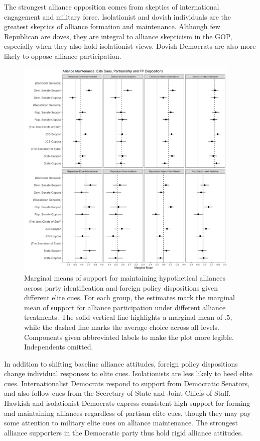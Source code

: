 \documentclass[12pt]{article}
\begin{document}
The strongest alliance opposition comes from skeptics of international engagement and military force. 
Isolationist and dovish individuals are the greatest skeptics of alliance formation and maintenance. 
Although few Republican are doves, they are integral to alliance skepticism in the GOP, especially when they also hold isolationist views.
Dovish Democrats are also more likely to oppose alliance participation.  


\begin{figure}
	\centering
		\includegraphics[width=0.95\textwidth]{../figures/party-dispo-main-el.png}
	\caption{Marginal means of support for maintaining hypothetical alliances across party identification and foreign policy dispositions given different elite cues. For each group, the estimates mark the marginal mean of support for alliance participation under different alliance treatments. The solid vertical line highlights a marginal mean of .5, while the dashed line marks the average choice across all levels. Components given abbreviated labels to make the plot more legible. Independents omitted.}
	\label{fig:party-dispo-main-el}
\end{figure}


In addition to shifting baseline alliance attitudes, foreign policy dispositions change individual responses to elite cues. 
Isolationists are less likely to heed elite cues. 
Internationalist Democrats respond to support from Democratic Senators, and also follow cues from the Secretary of State and Joint Chiefs of Staff. 
Hawkish and isolationist Democrats express consistent high support for forming and maintaining alliances regardless of partisan elite cues, though they may pay some attention to military elite cues on alliance maintenance. 
The strongest alliance supporters in the Democratic party thus hold rigid alliance attitudes.
\end{document}
